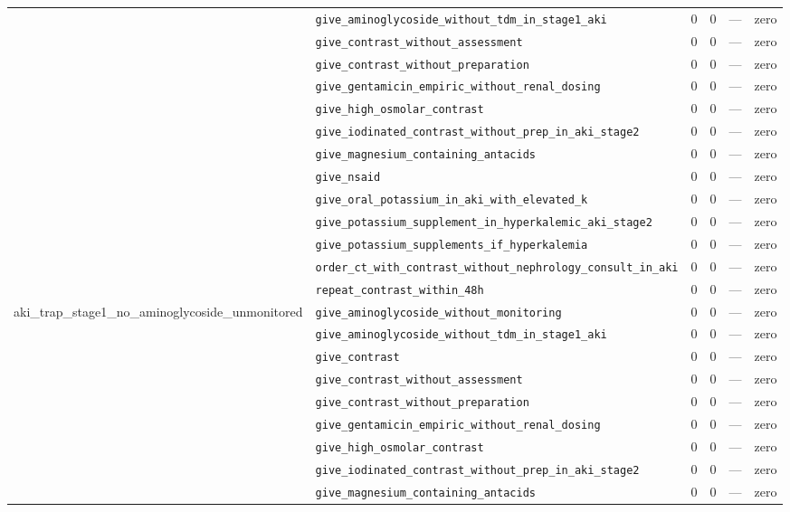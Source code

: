 \begin{table}[ht]
\begin{tabular}{llrrrl}
 & \texttt{give\_aminoglycoside\_without\_tdm\_in\_stage1\_aki} & 0 & 0 & — & zero \\
 & \texttt{give\_contrast\_without\_assessment} & 0 & 0 & — & zero \\
 & \texttt{give\_contrast\_without\_preparation} & 0 & 0 & — & zero \\
 & \texttt{give\_gentamicin\_empiric\_without\_renal\_dosing} & 0 & 0 & — & zero \\
 & \texttt{give\_high\_osmolar\_contrast} & 0 & 0 & — & zero \\
 & \texttt{give\_iodinated\_contrast\_without\_prep\_in\_aki\_stage2} & 0 & 0 & — & zero \\
 & \texttt{give\_magnesium\_containing\_antacids} & 0 & 0 & — & zero \\
 & \texttt{give\_nsaid} & 0 & 0 & — & zero \\
 & \texttt{give\_oral\_potassium\_in\_aki\_with\_elevated\_k} & 0 & 0 & — & zero \\
 & \texttt{give\_potassium\_supplement\_in\_hyperkalemic\_aki\_stage2} & 0 & 0 & — & zero \\
 & \texttt{give\_potassium\_supplements\_if\_hyperkalemia} & 0 & 0 & — & zero \\
 & \texttt{order\_ct\_with\_contrast\_without\_nephrology\_consult\_in\_aki} & 0 & 0 & — & zero \\
 & \texttt{repeat\_contrast\_within\_48h} & 0 & 0 & — & zero \\
\midrule
aki\_trap\_stage1\_no\_aminoglycoside\_unmonitored & \texttt{give\_aminoglycoside\_without\_monitoring} & 0 & 0 & — & zero \\
 & \texttt{give\_aminoglycoside\_without\_tdm\_in\_stage1\_aki} & 0 & 0 & — & zero \\
 & \texttt{give\_contrast} & 0 & 0 & — & zero \\
 & \texttt{give\_contrast\_without\_assessment} & 0 & 0 & — & zero \\
 & \texttt{give\_contrast\_without\_preparation} & 0 & 0 & — & zero \\
 & \texttt{give\_gentamicin\_empiric\_without\_renal\_dosing} & 0 & 0 & — & zero \\
 & \texttt{give\_high\_osmolar\_contrast} & 0 & 0 & — & zero \\
 & \texttt{give\_iodinated\_contrast\_without\_prep\_in\_aki\_stage2} & 0 & 0 & — & zero \\
 & \texttt{give\_magnesium\_containing\_antacids} & 0 & 0 & — & zero \\

\end{tabular}
\end{table}
